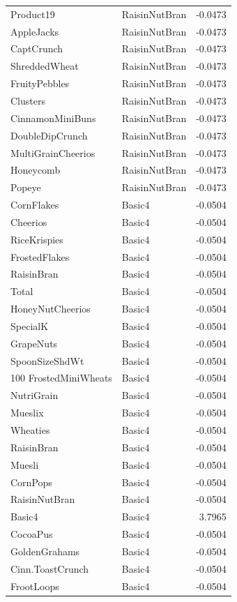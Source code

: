 \begin{longtable}{llr}
Product19 & RaisinNutBran & -0.0473 \\
AppleJacks & RaisinNutBran & -0.0473 \\
CaptCrunch & RaisinNutBran & -0.0473 \\
ShreddedWheat & RaisinNutBran & -0.0473 \\
FruityPebbles & RaisinNutBran & -0.0473 \\
Clusters & RaisinNutBran & -0.0473 \\
CinnamonMiniBuns & RaisinNutBran & -0.0473 \\
DoubleDipCrunch & RaisinNutBran & -0.0473 \\
MultiGrainCheerios & RaisinNutBran & -0.0473 \\
Honeycomb & RaisinNutBran & -0.0473 \\
Popeye & RaisinNutBran & -0.0473 \\
CornFlakes & Basic4 & -0.0504 \\
Cheerios & Basic4 & -0.0504 \\
RiceKrispies & Basic4 & -0.0504 \\
FrostedFlakes & Basic4 & -0.0504 \\
RaisinBran & Basic4 & -0.0504 \\
Total & Basic4 & -0.0504 \\
HoneyNutCheerios & Basic4 & -0.0504 \\
SpecialK & Basic4 & -0.0504 \\
GrapeNuts & Basic4 & -0.0504 \\
SpoonSizeShdWt & Basic4 & -0.0504 \\
100%
FrostedMiniWheats & Basic4 & -0.0504 \\
NutriGrain & Basic4 & -0.0504 \\
Mueslix & Basic4 & -0.0504 \\
Wheaties & Basic4 & -0.0504 \\
RaisinBran & Basic4 & -0.0504 \\
Muesli & Basic4 & -0.0504 \\
CornPops & Basic4 & -0.0504 \\
RaisinNutBran & Basic4 & -0.0504 \\
Basic4 & Basic4 & 3.7965 \\
CocoaPus & Basic4 & -0.0504 \\
GoldenGrahams & Basic4 & -0.0504 \\
Cinn.ToastCrunch & Basic4 & -0.0504 \\
FrootLoops & Basic4 & -0.0504 \\

\end{longtable}
